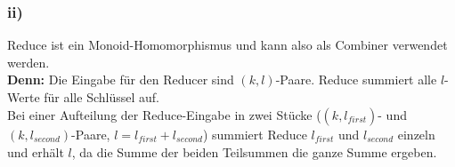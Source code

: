 \documentclass{article}
\begin{document}
\subsubsection*{ii)}
Reduce ist ein Monoid-Homomorphismus und kann also als Combiner verwendet werden.\\
\textbf{Denn: } Die Eingabe f\"ur den Reducer sind $(k,l)$-Paare. Reduce summiert alle $l$-Werte f\"ur alle Schl\"ussel auf.\\
Bei einer Aufteilung der Reduce-Eingabe in zwei St\"ucke
($(k, l_{\textit{first}})$- und $(k,l_{\textit{second}})$-Paare, $l=l_{\textit{first}}+l_{\textit{second}}$)
summiert Reduce $l_{\textit{first}}$ und $l_{\textit{second}}$ einzeln und erh\"alt $l$, da die Summe der beiden Teilsummen die ganze Summe ergeben. 
\end{document}

